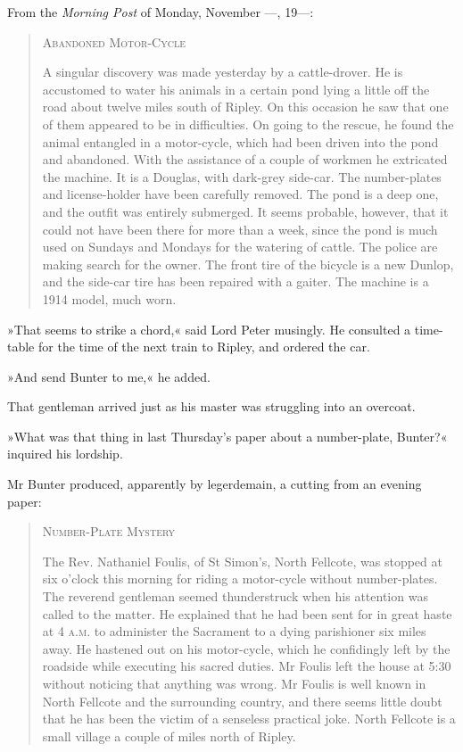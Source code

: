 From the \textit{Morning Post} of Monday, November —, 19—:
\begin{quote}
\begin{center}
\textsc{Abandoned Motor-Cycle}
\end{center}

A singular discovery was made yesterday by a cattle-drover. He is accustomed to water his animals in a certain pond lying a little off the road about twelve miles south of Ripley. On this occasion he saw that one of them appeared to be in difficulties. On going to the rescue, he found the animal entangled in a motor-cycle, which had been driven into the pond and abandoned. With the assistance of a couple of workmen he extricated the machine. It is a Douglas, with dark-grey side-car. The number-plates and license-holder have been carefully removed. The pond is a deep one, and the outfit was entirely submerged. It seems probable, however, that it could not have been there for more than a week, since the pond is much used on Sundays and Mondays for the watering of cattle. The police are making search for the owner. The front tire of the bicycle is a new Dunlop, and the side-car tire has been repaired with a gaiter. The machine is a 1914 model, much worn.
\end{quote}

»That seems to strike a chord,« said Lord Peter musingly. He consulted a time-table for the time of the next train to Ripley, and ordered the car.

»And send Bunter to me,« he added.

That gentleman arrived just as his master was struggling into an overcoat.

»What was that thing in last Thursday's paper about a number-plate, Bunter?« inquired his lordship.

Mr Bunter produced, apparently by legerdemain, a cutting from an evening paper:

\begin{quote}
\begin{center}
\textsc{Number-Plate Mystery}
\end{center}

The Rev. Nathaniel Foulis, of St Simon's, North Fellcote, was stopped at six o'clock this morning for riding a motor-cycle without number-plates. The reverend gentleman seemed thunderstruck when his attention was called to the matter. He explained that he had been sent for in great haste at 4 \textsc{a.m.} to administer the Sacrament to a dying parishioner six miles away. He hastened out on his motor-cycle, which he confidingly left by the roadside while executing his sacred duties.  Mr Foulis left the house at 5:30 without noticing that anything was wrong. Mr Foulis is well known in North Fellcote and the surrounding country, and there seems little doubt that he has been the victim of a senseless practical joke. North Fellcote is a small village a couple of miles north of Ripley.
\end{quote}

